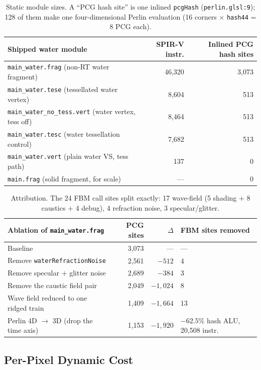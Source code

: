 \documentclass[11pt,a4paper]{article}
\begin{document}
\begin{table}[h]
\centering
\small
\begin{tabular}{@{}lrr@{}}
\toprule
\textbf{Shipped water module} & \textbf{SPIR-V instr.} & \textbf{Inlined PCG hash sites} \\
\midrule
\texttt{main\_water.frag} (non-RT water fragment) & 46,320 & 3,073 \\
\texttt{main\_water.tese} (tessellated water vertex) & 8,604 & 513 \\
\texttt{main\_water\_no\_tess.vert} (water vertex, tess off) & 8,464 & 513 \\
\texttt{main\_water.tesc} (water tessellation control) & 7,682 & 513 \\
\texttt{main\_water.vert} (plain water VS, tess path) & 137 & 0 \\
\texttt{main.frag} (solid fragment, for scale) & --- & 0 \\
\bottomrule
\end{tabular}
\caption{Static module sizes. A ``PCG hash site'' is one inlined \texttt{pcgHash} (\texttt{perlin.glsl:9}); 128 of them
make one four-dimensional Perlin evaluation (16 corners $\times$ \texttt{hash44} = 8 PCG each).}
\end{table}

\begin{table}[h]
\centering
\small
\begin{tabular}{@{}lrrl@{}}
\toprule
\textbf{Ablation of \texttt{main\_water.frag}} & \textbf{PCG sites} & $\Delta$ & \textbf{FBM sites removed} \\
\midrule
Baseline & 3,073 & --- & --- \\
Remove \texttt{waterRefractionNoise} & 2,561 & $-512$ & 4 \\
Remove specular $+$ glitter noise & 2,689 & $-384$ & 3 \\
Remove the caustic field pair & 2,049 & $-1{,}024$ & 8 \\
Wave field reduced to one ridged train & 1,409 & $-1{,}664$ & 13 \\
Perlin 4D $\rightarrow$ 3D (drop the time axis) & 1,153 & $-1{,}920$ & $-62.5\%$ hash ALU, 20,508 instr. \\
\bottomrule
\end{tabular}
\caption{Attribution. The 24 FBM call sites split exactly: 17 wave-field (5 shading $+$ 8 caustics $+$ 4 debug), 4
refraction noise, 3 specular/glitter.}
\end{table}

\subsection{Per-Pixel Dynamic Cost}
\end{document}
